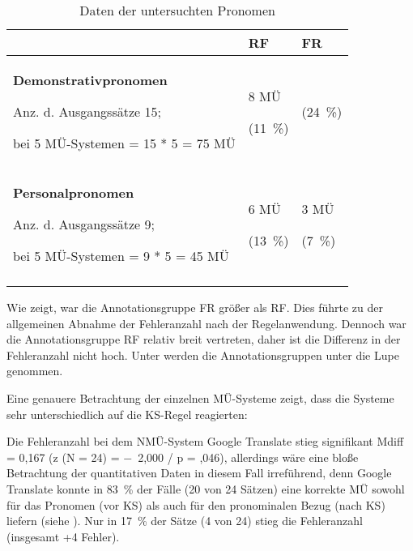 \begin{table}
\begin{tabularx}{\textwidth}{Xll}

\lsptoprule
& \textbf{RF} & \textbf{FR}\\
\midrule
\textbf{Demonstrativpronomen}

Anz. d. Ausgangssätze 15;

bei 5 MÜ-Systemen = 15 * 5 = 75 MÜ & {8 MÜ}

 (11~\%) & \cellcolor{lsLightGray}{18 MÜ}

 (24~\%)\\
\textbf{Personalpronomen}

Anz. d. Ausgangssätze 9;

bei 5 MÜ-Systemen = 9 * 5 = 45 MÜ & {6 MÜ}

 (13~\%) & {3 MÜ}

 (7~\%)\\

\lspbottomrule
\end{tabularx}
\caption{\label{tab:05:48}Daten der untersuchten Pronomen   }
\end{table}

Wie  zeigt, war die Annotationsgruppe FR größer als RF. Dies führte zu der allgemeinen Abnahme der Fehleranzahl nach der Regelanwendung. Dennoch war die Annotationsgruppe RF relativ breit vertreten, daher ist die Differenz in der Fehleranzahl nicht hoch. Unter  werden die Annotationsgruppen unter die Lupe genommen.


Eine genauere Betrachtung der einzelnen MÜ-Systeme zeigt, dass die Systeme sehr unterschiedlich auf die KS-Regel reagierten:

Die Fehleranzahl bei dem NMÜ-System Google Translate stieg signifikant Mdiff = 0,167 (z (N = 24) = $-$~2,000 / p = ,046), allerdings wäre eine bloße Betrachtung der quantitativen Daten in diesem Fall irreführend, denn Google Translate konnte in 83~\% der Fälle (20 von 24 Sätzen) eine korrekte MÜ sowohl für das Pronomen (vor KS) als auch für den pronominalen Bezug (nach KS) liefern (siehe ). Nur in 17~\% der Sätze (4 von 24) stieg die Fehleranzahl (insgesamt +4 Fehler).


